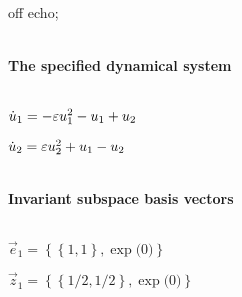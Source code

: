 
off echo;


\(\)
\paragraph{The specified dynamical system}
\(
\)\par

\(\dot u_{1}=-\varepsilon u\sb1^{2}-u\sb1+u\sb2
\)\par

\(\dot u_{2}=\varepsilon u\sb2^{2}+u\sb1-u\sb2
\)\par

\(\)
\paragraph{Invariant subspace basis vectors}
\(
\)\par

\(\vec e_{1}=\left\{
\left\{
1 , 1
\right\} , \exp \big(0\big)
\right\}
\)\par

\(\vec z_{1}=\left\{
\left\{
1/2 , 1/2
\right\} , \exp \big(0\big)
\right\}
\)\par
